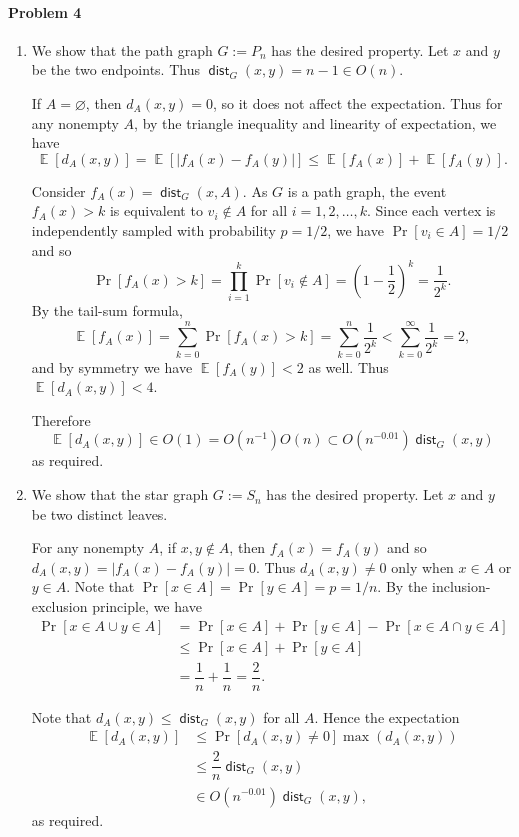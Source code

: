 \documentclass[12pt]{article}
\DeclareMathOperator{\dist}{\mathsf{dist}}
\DeclareMathOperator{\E}{\mathbb{E}}
\begin{document}
\paragraph{Problem 4}
\begin{enumerate}[label=\alph*., font=\bfseries]
\item
We show that the path graph $G:=P_n$ has the desired property. Let $x$ and $y$ be the two endpoints. Thus $\dist_G(x,y)=n-1\in O(n)$.

If $A=\varnothing$, then $d_A(x,y)=0$, so it does not affect the expectation. Thus for any nonempty $A$, by the triangle inequality and linearity of expectation, we have
\[\E[d_A(x,y)]=\E[|f_A(x)-f_A(y)|]\le\E[f_A(x)]+\E[f_A(y)].\]

Consider $f_A(x)=\dist_G(x,A)$. As $G$ is a path graph, the event $f_A(x)>k$ is equivalent to $v_i\notin A$ for all $i=1,2,\dots,k$. Since each vertex is independently sampled with probability $p=1/2$, we have $\Pr[v_i\in A]=1/2$ and so $$\Pr[f_A(x)>k]=\prod_{i=1}^k\Pr[v_i\notin A]=\left(1-\dfrac 1 2\right)^k=\dfrac{1}{2^k}.$$
By the tail-sum formula,
$$\E[f_A(x)]=\sum_{k=0}^n\Pr[f_A(x)>k]=\sum_{k=0}^n\dfrac{1}{2^k}<\sum_{k=0}^\infty\dfrac{1}{2^k}=2,$$
and by symmetry we have $\E[f_A(y)]<2$ as well. Thus $\E[d_A(x,y)]<4$.

Therefore $$\E[d_A(x,y)]\in O(1)=O(n^{-1})O(n)\subset O(n^{-0.01})\dist_G(x,y)$$ as required.
\item
We show that the star graph $G:=S_n$ has the desired property. Let $x$ and $y$ be two distinct leaves.

For any nonempty $A$, if $x,y\notin A$, then $f_A(x)=f_A(y)$ and so $d_A(x,y)=|f_A(x)-f_A(y)|=0$. Thus $d_A(x,y)\neq0$ only when $x\in A$ or $y\in A$. Note that $\Pr[x\in A]=\Pr[y\in A]=p=1/n$. By the inclusion-exclusion principle, we have
\begin{align*}
\Pr[x\in A\cup y\in A]&=\Pr[x\in A] + \Pr[y\in A] - \Pr[x\in A\cap y\in A]\\
&\le \Pr[x\in A] + \Pr[y\in A]\\
&=\dfrac 1 n+\dfrac 1 n = \dfrac 2 n.
\end{align*}

Note that $d_A(x,y)\le\dist_G(x,y)$ for all $A$. Hence the expectation
\begin{align*}
\E[d_A(x,y)]&\le\Pr[d_A(x,y)\ne 0]\max(d_A(x,y))\\
&\le\dfrac 2 n\dist_G(x,y)\\
&\in O(n^{-0.01})\dist_G(x,y),
\end{align*}
as required.
\end{enumerate}
\end{document}

